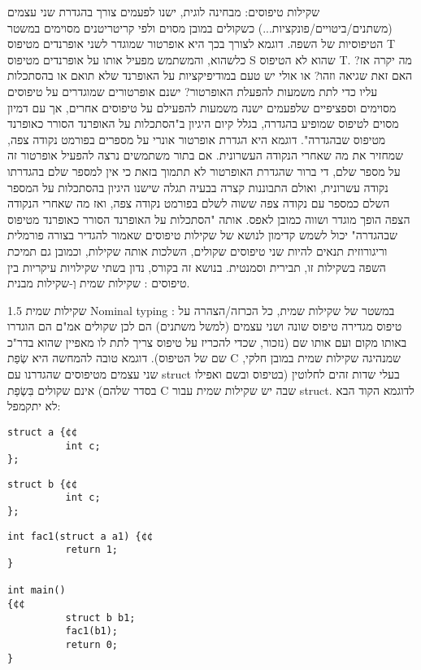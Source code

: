       שקילות טיפוסים:
      מבחינה לוגית, ישנו לפעמים צורך בהגדרת שני עצמים (משתנים/ביטויים/פונקציות...)
      כשקולים במובן מסוים ולפי קריטריטנים מסוימים במשטר הטיפוסיות של השפה. דוגמא
      לצורך בכך היא אופרטור שמוגדר לשני אופרנדים מטיפוס T כלשהוא, והמשתמש מפעיל אותו
      על אופרנדים מטיפוס S שהוא לא הטיפוס T. מה יקרה אז? האם זאת שגיאה וזהו? או אולי
      יש טעם במודיפיקציות על האופרנד שלא תואם או בהסתכלות עליו כדי לתת משמעות להפעלת
      האופרטור? ישנם אופרטורים שמוגדרים על טיפוסים מסוימים וספציפיים שלפעמים ישנה
      משמעות להפעילם על טיפוסים אחרים, אך עם דמיון מסוים לטיפוס שמופיע בהגדרה, בגלל
      קיום היגיון ב"הסתכלות על האופרנד הסורר כאופרנד מטיפוס שבהגדרה". דוגמא היא הגדרת
      אופרטור אונרי על מספרים בפורמט נקודה צפה, שמחזיר את מה שאחרי הנקודה העשרונית.
      אם בתור משתמשים נרצה להפעיל אופרטור זה על מספר שלם, די ברור שהגדרת האופרטור לא
      תתמוך בזאת כי אין למספר שלם בהגדרתו נקודה עשרונית, ואולם התבוננות קצרה בבעיה
      תגלה שישנו היגיון בהסתכלות על המספר השלם כמספר עם נקודה צפה ששוה לשלם בפורמט
      נקודה צפה, ואז מה שאחרי הנקודה הצפה הופך מוגדר ושווה כמובן לאפס. אותה "הסתכלות
      על האופרנד הסורר כאופרנד מטיפוס שבהגדרה" יכול לשמש קדימון לנושא של שקילות
      טיפוסים שאמור להגדיר בצורה פורמלית וריגורוזית תנאים להיות שני טיפוסים שקולים,
      השלכות אותה שקילות, וכמובן גם תמיכת השפה בשקילות זו, תבירית וסמנטית. בנושא זה
      בקורס, נדון בשתי שקילויות עיקריות בין טיפוסים : שקילות שמית וְ-שקילות מבנית.

      1.5 שקילות שמית Nominal typing :
      במשטר של שקילות שמית, כל הכרזה/הצהרה על טיפוס מגדירה טיפוס שונה ושני עצמים
      (למשל משתנים) הם לכן שקולים אמ"ם הם הוגדרו באותו מקום ועם אותו שם (נזכור, שכדי
      להכריז על טיפוס צריך לתת לו מאפיין שהוא בדר"כ שם של הטיפוס). דוגמא טובה להמחשה
      היא שְׂפַת C שמנהיגה שקילות שמית במובן חלקי, שני עצמים מטיפוסים שהגדרנו עם struct
      בעלי שדות זהים לחלוטין (בטיפוס ובשם ואפילו בסדר שלהם) אינם שקולים בִּשְׂפַת C שבה יש
      שקילות שמית עבור struct. לדוגמא הקוד הבא לא יתקמפל:

\begin{verbatim}
struct a {¢¢
          int c;
};
\end{verbatim}

\begin{verbatim}
struct b {¢¢
          int c;
};
\end{verbatim}

\begin{verbatim}
int fac1(struct a a1) {¢¢
          return 1;
}

int main()
{¢¢
          struct b b1;
          fac1(b1);
          return 0;
}
\end{verbatim}

